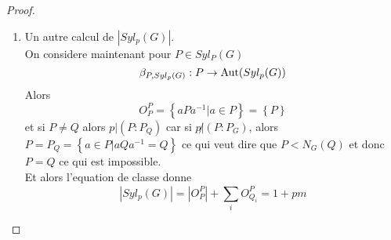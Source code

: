 \documentclass[../main.tex]{subfiles}
\begin{document}
\begin{proof}
\begin{enumerate}
\item Un autre calcul de $ |Syl_p( G) | $.\\
	On considere maintenant pour $P \in Syl_P( G) $ 
	\[ 
	\beta_{P, Syl_p( G) } : P \to \operatorname{Aut}( Syl_p( G) ) 
	\]
	Alors 
	\[ 
	O_P^{P}= \left\{ aPa^{-1}| a\in P \right\} = \left\{ P \right\} 
	\]
	et si $P \neq Q$ alors $p | ( P:P_Q) $ car si $p \not| ( P:P_G) $, alors $P = P_Q = \left\{ a \in P | aQa^{-1}= Q \right\} $ ce qui veut dire que $P < N_G( Q) $ et donc $P= Q$ ce qui est impossible.\\
	Et alors l'equation de classe donne
\[ 
|Syl_p( G) | = |O_P^{P}| + \sum_{i}^{ } O_{Q_i} ^{P} = 1+pm
\]
	


\end{enumerate}



\end{proof}
\end{document}
